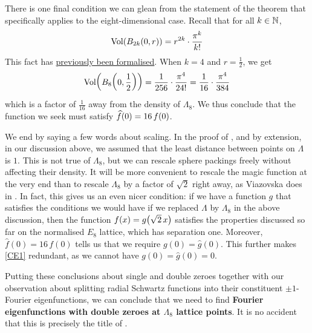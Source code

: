 There is one final condition we can glean from the statement of the theorem that specifically applies to the eight-dimensional case. Recall that for all $k \in \mathbb{N}$,
\begin{align*}
    \operatorname{Vol}\!\left( B_{2k}\!\left( 0, r \right) \right) = r^{2k} \cdot \frac{\pi^k}{k!}
\end{align*}
This fact has \href{https://github.com/leanprover-community/mathlib4/blob/6c6e0180f0d3dc9f47f85532f48d268d8656789a/Mathlib/MeasureTheory/Measure/Lebesgue/VolumeOfBalls.lean#L375-L379}{previously been formalised}. When $k = 4$ and $r = \frac{1}{2}$, we get
\begin{align*}
    \operatorname{Vol}\!\left( B_{8}\!\left( 0, \frac{1}{2} \right) \right) = \frac{1}{256} \cdot \frac{\pi^4}{24!} = \frac{1}{16} \cdot \frac{\pi^4}{384}
\end{align*}
which is a factor of $\frac{1}{16}$ away from the density of $\Lambda_8$. We thus conclude that the function we seek must satisfy $\widehat{f}\!\left( 0 \right) = 16 \, f(0)$.

We end by saying a few words about scaling. In the proof of , and by extension, in our discussion above, we assumed that the least distance between points on $\Lambda$ is $1$. This is not true of $\Lambda_8$, but we can rescale sphere packings freely without affecting their density. It will be more convenient to rescale the magic function at the very end than to rescale $\Lambda_8$ by a factor of $\sqrt{2}$ right away, as Viazovska does in \cite{Viazovska8}. In fact, this gives us an even nicer condition: if we have a function $g$ that satisfies the conditions we would have if we replaced $\Lambda$ by $\Lambda_8$ in the above discussion, then the function $f(x) = g\!\left( \sqrt{2} \, x \right)$ satisfies the properties discussed so far on the normalised $E_8$ lattice, which has separation one. Moreover, $\hat{f}(0) = 16 \, f(0)$ tells us that we require $g(0) = \hat{g}(0)$. This further makes \ref{CE1} redundant, as we cannot have $g(0) = \hat{g}(0) = 0$.

Putting these conclusions about single and double zeroes together with our observation about splitting radial Schwartz functions into their constituent $\pm 1$-Fourier eigenfunctions, we can conclude that we need to find \textbf{Fourier eigenfunctions with double zeroes at $\Lambda_8$ lattice points}. It is no accident that this is precisely the title of \cite[\S 4]{Viazovska8}.